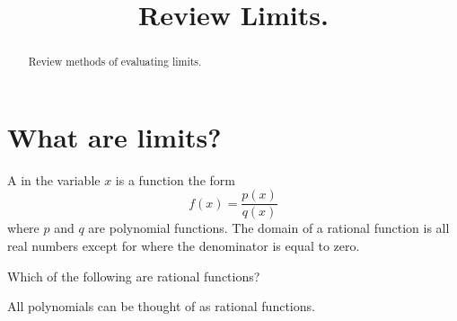 \documentclass{ximera}
\title[Dig-In:]{Review Limits.}
\begin{document}
\begin{abstract}
  Review methods of evaluating limits.
\end{abstract}
\maketitle


\section{What are limits?}

\begin{definition}
  A  in the variable $x$ is a function the form
  \[
  f(x) = \frac{p(x)}{q(x)}
  \]
  where $p$ and $q$ are polynomial functions. The domain of a rational
  function is all real numbers except for where the denominator is
  equal to zero.
\end{definition}

\begin{question}
  Which of the following are rational functions?
  \begin{selectAll}
  \end{selectAll}
  \begin{feedback}
    All polynomials can be thought of as rational functions.
  \end{feedback}
\end{question}
\end{document}
